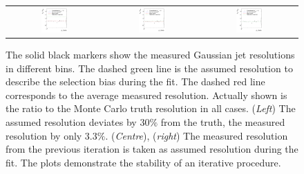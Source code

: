 \begin{figure}[ht]
  \centering
    \begin{tabular}{ccc}
      \includegraphics[width=0.3\textwidth]{figures/ResFit_Spring10QCDFlat_GaussUp30It0_Eta0_ExtrapolatedResolutionRatio} &
      \includegraphics[width=0.3\textwidth]{figures/ResFit_Spring10QCDFlat_GaussUp30It1_Eta0_ExtrapolatedResolutionRatio} &
      \includegraphics[width=0.3\textwidth]{figures/ResFit_Spring10QCDFlat_GaussUp30It2_Eta0_ExtrapolatedResolutionRatio}
    \end{tabular}
  \caption{The solid black markers show the measured Gaussian jet \pt resolutions in different \pt bins.
  The dashed green line is the assumed resolution to describe the selection bias during the fit.
  The dashed red line corresponds to the average measured resolution.
  Actually shown is the ratio to the Monte Carlo truth resolution in all cases.
  (\textit{Left}) The assumed resolution deviates by $30\%$ from the truth, the measured resolution by only $3.3\%$.
  (\textit{Centre}), (\textit{right}) The measured resolution from the previous iteration is taken as assumed resolution during the fit.
  The plots demonstrate the stability of an iterative procedure.}
  \label{fig:ResFig:QCD:Extrapolation:Gauss:Iterations}
\end{figure}

